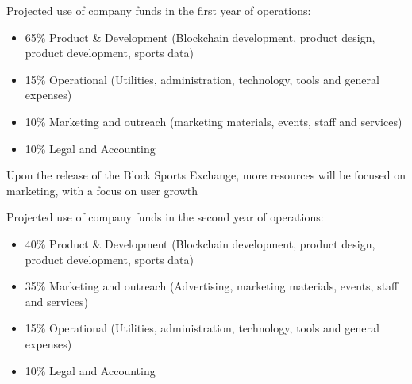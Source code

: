 \documentclass{article}
\begin{document}
Projected use of company funds in the first year of operations:

\begin{itemize}
	\item  65\% Product \& Development (Blockchain development, product design, product development, sports data)
	\item 15\% Operational (Utilities, administration, technology, tools and general expenses)
	\item 10\% Marketing and outreach (marketing materials, events, staff and services)
	\item 10\% Legal and Accounting
\end{itemize}

Upon the release of the Block Sports Exchange, more resources will be focused on marketing, with a focus on user growth

Projected use of company funds in the second year of operations: 

\begin{itemize}
	\item 40\% Product \& Development (Blockchain development, product design, product development, sports data)
	\item 35\% Marketing and outreach (Advertising, marketing materials, events, staff and services)
	\item 15\% Operational (Utilities, administration, technology, tools and general expenses)
	\item 10\% Legal and Accounting
\end{itemize}
\end{document}
